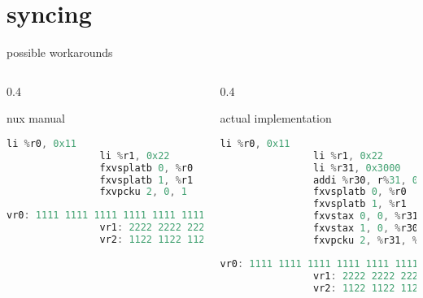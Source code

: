 \documentclass[10pt]{beamer}
\begin{document}
\section{syncing}
\begin{frame}[fragile]{possible workarounds}{}
	\begin{columns}[t]
		\begin{column}{0.4\textwidth}
			\begin{block}{nux manual}
			\begin{lstlisting}[language=C++,basicstyle=\ttfamily\scriptsize,keywordstyle=\color{red}]
				li %r0, 0x11
				li %r1, 0x22
				fxvsplatb 0, %r0
				fxvsplatb 1, %r1
				fxvpcku 2, 0, 1
			\end{lstlisting}
      		\begin{lstlisting}[language=C++,basicstyle=\fontsize{5}{7}\selectfont\ttfamily,keywordstyle=\color{red}]
				vr0: 1111 1111 1111 1111 1111 1111 1111 1111
				vr1: 2222 2222 2222 2222 2222 2222 2222 2222
				vr2: 1122 1122 1122 1122 1122 1122 1122 1122
			\end{lstlisting}
			\end{block}
    	\end{column}
    	\begin{column}{0.4\textwidth}
    		\begin{block}{actual implementation}
    		\begin{lstlisting}[language=C++,basicstyle=\ttfamily\scriptsize,keywordstyle=\color{red}]
				li %r0, 0x11
				li %r1, 0x22
				li %r31, 0x3000
				addi %r30, r%31, 0x10
				fxvsplatb 0, %r0
				fxvsplatb 1, %r1
				fxvstax 0, 0, %r31
				fxvstax 1, 0, %r30
				fxvpcku 2, %r31, %r30
			\end{lstlisting}
      		\begin{lstlisting}[language=C++,basicstyle=\fontsize{5}{7}\selectfont\ttfamily,keywordstyle=\color{red}]
				vr0: 1111 1111 1111 1111 1111 1111 1111 1111
				vr1: 2222 2222 2222 2222 2222 2222 2222 2222
				vr2: 1122 1122 1122 1122 1122 1122 1122 1122
			\end{lstlisting}
			\end{block}
    	\end{column}
	\end{columns}
\end{frame}
\end{document}
